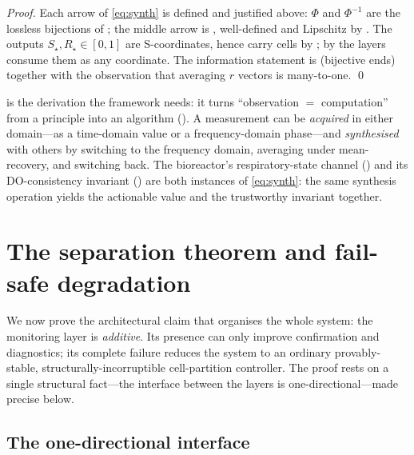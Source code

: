 \documentclass[11pt,a4paper,twocolumn]{article}
\theoremstyle{thmstyle}
\theoremstyle{definition}
\theoremstyle{remark}
\newcommand{\Rstar}{R_{\star}}
\begin{document}
\begin{proof}
Each arrow of \eqref{eq:synth} is defined and justified above: $\Phi$ and
$\Phi^{-1}$ are the lossless bijections of ; the middle
arrow is , well-defined and Lipschitz by
. The outputs $S_\star,\Rstar\in[0,1]$ are
S-coordinates, hence carry cells by ; by
 the layers consume them as any coordinate. The
information statement is  (bijective ends) together with
the observation that averaging $r$ vectors is many-to-one. \qed
\end{proof}

 is the derivation the framework needs: it turns
``observation $=$ computation'' from a principle into an algorithm
(). A measurement can be \emph{acquired} in either
domain---as a time-domain value or a frequency-domain phase---and
\emph{synthesised} with others by switching to the frequency domain,
averaging under mean-recovery, and switching back. The bioreactor's
respiratory-state channel () and its
DO-consistency invariant () are both instances of
\eqref{eq:synth}: the same synthesis operation yields the actionable value
and the trustworthy invariant together.

\section{The separation theorem and fail-safe degradation}
\label{sec:separation}

We now prove the architectural claim that organises the whole system: the
monitoring layer is \emph{additive}. Its presence can only improve
confirmation and diagnostics; its complete failure reduces the system to
an ordinary provably-stable, structurally-incorruptible cell-partition
controller. The proof rests on a single structural fact---the interface
between the layers is one-directional---made precise below.

\subsection{The one-directional interface}
\end{document}
